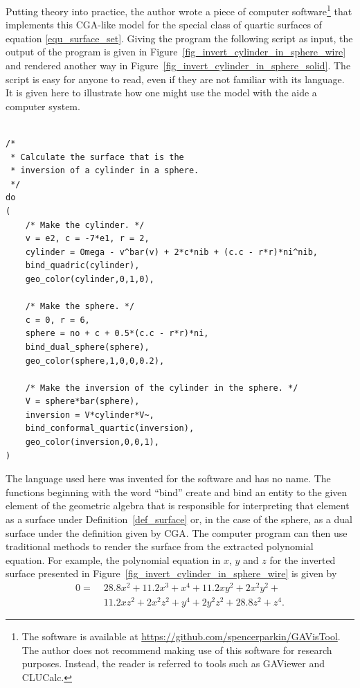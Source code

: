 \documentclass{birkjour}
\theoremstyle{definition}
\theoremstyle{remark}
\numberwithin{equation}{section}
\begin{document}
Putting theory into practice, the author wrote a piece of computer
software\footnote{The software is available
at \url{https://github.com/spencerparkin/GAVisTool}.  The author does
not recommend making use of this software for research purposes.  Instead,
the reader is referred to tools such as GAViewer and CLUCalc.}
that implements this CGA-like model for the special class of
quartic surfaces of equation \eqref{equ_surface_set}.  Giving the program the following
script as input, the output of the program is given in
Figure~\ref{fig_invert_cylinder_in_sphere_wire} and rendered another way in
Figure~\ref{fig_invert_cylinder_in_sphere_solid}.
The script is easy for anyone to read, even if they are not familiar with its language.  It is given
here to illustrate how one might use the model with the aide a computer system.
\begin{center}
{\tiny
\begin{verbatim}

/*
 * Calculate the surface that is the
 * inversion of a cylinder in a sphere.
 */
do
(
    /* Make the cylinder. */
    v = e2, c = -7*e1, r = 2,
    cylinder = Omega - v^bar(v) + 2*c*nib + (c.c - r*r)*ni^nib,
    bind_quadric(cylinder),
    geo_color(cylinder,0,1,0),
	
    /* Make the sphere. */
    c = 0, r = 6,
    sphere = no + c + 0.5*(c.c - r*r)*ni,
    bind_dual_sphere(sphere),
    geo_color(sphere,1,0,0,0.2),
	
    /* Make the inversion of the cylinder in the sphere. */
    V = sphere*bar(sphere),
    inversion = V*cylinder*V~,
    bind_conformal_quartic(inversion),
    geo_color(inversion,0,0,1),
)

\end{verbatim}
}
\end{center}
The language used here was invented for the software and has no name.
The functions beginning with the word ``bind'' create and bind an entity to the given
element of the geometric algebra that is responsible for interpreting that element
as a surface under Definition~\ref{def_surface} or, in the case of the sphere, as a dual surface under the definition
given by CGA.  The computer program can then
use traditional methods to render the surface from the extracted polynomial equation.
For example, the polynomial equation in $x$, $y$ and $z$ for the inverted surface presented
in Figure~\ref{fig_invert_cylinder_in_sphere_wire} is given by
\begin{equation}
\begin{split}
0 =\;& 28.8x^{2} + 11.2x^{3} + x^{4} + 11.2xy^{2} + 2x^{2}y^{2} + \\
 & 11.2xz^{2} + 2x^{2}z^{2} + y^{4} + 2y^{2}z^{2} + 28.8z^{2} + z^{4}.
\end{split}
\end{equation}
\end{document}
